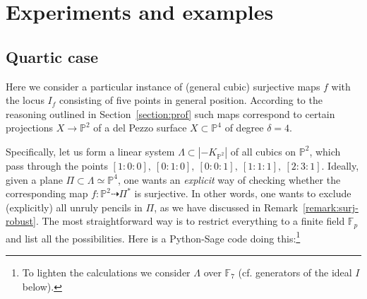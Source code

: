 \documentclass[14pt]{amsart}
\theoremstyle{definition}
\theoremstyle{remark}
\newcommand{\p}{\mathbb{P}}
\newcommand{\map}{\longrightarrow}
\begin{document}
\bigskip

\section{Experiments and examples}
\label{section:ex-calc}

\subsection{Quartic case}
\label{subsection:ex-calc-1}

Here we consider a particular instance of (general cubic)
surjective maps $f$ with the locus $I_f$ consisting of five points
in general position. According to the reasoning outlined in
Section~\ref{section:prof} such maps correspond to certain
projections $X \map \p^2$ of a del Pezzo surface $X \subset \p^4$
of degree $\delta = 4$.

Specifically, let us form a linear system $\Lambda \subset
|-K_{\p^2}|$ of all cubics on $\p^2$, which pass through the
points $[1:0:0],\ [0:1:0],\ [0:0:1],\ [1:1:1],\ [2:3:1]$. Ideally,
given a plane $\Pi \subset \Lambda \simeq \p^4$, one wants an
\emph{explicit} way of checking whether the corresponding map $f:
\p^2 \dashrightarrow \Pi^*$ is surjective. In other words, one
wants to exclude (explicitly) all unruly pencils in $\Pi$, as we
have discussed in Remark~\ref{remark:surj-robust}. The most
straightforward way is to restrict everything to a finite field
$\mathbb{F}_p$ and list all the possibilities. Here is a
Python-Sage code doing this:\footnote{To lighten the calculations
we consider $\Lambda$ over $\mathbb{F}_7$ (cf. generators of the
ideal $I$ below).}

\medskip
\end{document}
